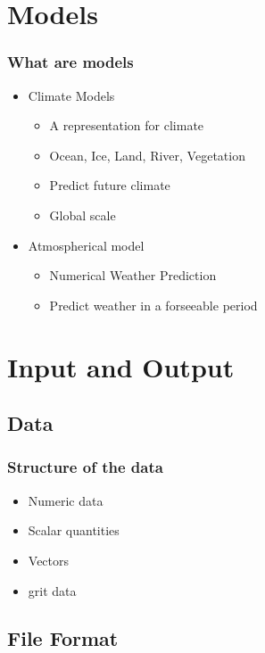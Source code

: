 \documentclass[compress]{beamer}
\begin{document}
\section{Models}
\begin{frame}
    \frametitle{What are models}
    
    \begin{itemize}
		\item Climate Models
		\begin{itemize}
			\item A representation for climate
			\item Ocean, Ice, Land, River, Vegetation
			\item Predict future climate
			\item Global scale
		\end{itemize}
		
		\item Atmospherical model
		\begin{itemize}
			\item Numerical Weather Prediction
			\item Predict weather in a forseeable period
		\end{itemize}
    \end{itemize}
    
\end{frame}


\section{Input and Output}
\subsection{Data}

\begin{frame}[fragile]
	\frametitle{Structure of the data}

		\begin{itemize}
		    \item Numeric data
			\item Scalar quantities
			\item Vectors
			\item grit data
		\end{itemize}
	
\end{frame}

\subsection{File Format}
\end{document}

